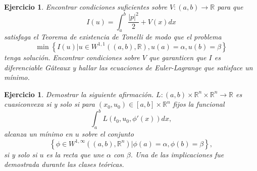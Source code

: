 \documentclass{article}
\newcounter{ejer}
\newtheorem{ejercicio}[ejer]{Ejercicio}}
\newcommand{\rr}{\mathbb{R}}
\begin{document}
\begin{ejercicio} Encontrar condiciones suficientes sobre $V:(a,b)\to\rr$ para que
\[I(u)=\int_a^b\frac{|p|^2}{2}+V(x)dx\]
satisfaga el Teorema de existencia de Tonelli de modo que el problema
\[\min\left\{I(u)\bigg| u\in W^{1,1}((a,b),\rr), u(a)=\alpha, u(b)=\beta\right\}\]
tenga solución. Encontrar condiciones  sobre $V$ que garanticen que $I$ es diferenciable G\^ateaux y hallar las ecuaciones de Euler-Lagrange que satisface un mínimo.

\end{ejercicio}

\begin{ejercicio} Demostrar la siguiente afirmación. $L:(a,b)\times\rr^n\times\rr^n\to\rr$ es cuasiconvexa si y solo si para $(x_0,u_0)\in [a,b]\times\rr^n$ fijos la funcional
\[\int_a^bL(t_0,u_0,\phi'(x))dx,\]
alcanza un mínimo en $u$ sobre el conjunto
\[\left\{\phi\in W^{1,\infty}((a,b),\rr^n)| \phi(a)=\alpha, \phi(b)=\beta\right\},\]
si y solo si $u$ es la recta que une $\alpha$ con $\beta$. Una de las implicaciones fue demostrada durante las clases teóricas.

\end{ejercicio}
\end{document}
